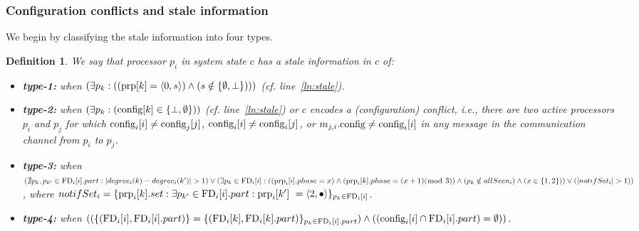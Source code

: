 \documentclass[11pt]{article}
\newcommand{\notif}{prp}
\newcommand{\notifSet}{notifSet}
\newtheorem{definition}{Definition}[section]
\begin{document}
\subsubsection*{Configuration conflicts and stale information}


We begin by classifying the stale information into four types. 


\begin{definition}
\label{def:type}
We say that processor $p_i$ in system state $c$ has a stale information in $c$ of:
\begin{itemize}[topsep=2pt,itemsep=-.5ex,partopsep=.5ex,parsep=1ex,leftmargin=.5cm]
	\item[]{\bf type-1:} when 
$(\exists p_k : ((\textnormal{prp}[k]=\langle 0, s \rangle) \land (s \notin \{ \emptyset, \bot\})))$ (cf. line~\ref{ln:stale}). 
	\item[]{\bf type-2:} when $(\exists p_k : (\textnormal{config}[k] \in \{ \bot, \emptyset\}))$ (cf. line~\ref{ln:stale}) or $c$ encodes a \emph{(configuration) conflict}, i.e., there are two active processors $p_i$ and $p_j$ for which $\textnormal{config}_i[i] \neq \textnormal{config}_j[j]$, $\textnormal{config}_i[i] \neq \textnormal{config}_i[j]$, or $m_{j,i}.\textnormal{config}\neq\textnormal{config}_i[i]$ in any message in the communication channel from $p_i$ to $p_j$.
\item[]{\bf type-3:} when $(\nexists p_k, p_{k'} \in \textnormal{FD}_i[i].part: |degree_i(k)-degree_i(k')|> 1) \lor (\exists p_k \in \textnormal{FD}_i[i] : ((\textnormal{\notif}_i[i].phase =x) \land (\textnormal{\notif}_i[k].phase =(x+1)(\bmod ~3)) \land (p_k \notin allSeen_i) \land (x \in \{1, 2 \} ))\lor (|\notifSet_i|>1))$, where $\notifSet_i=\{ \textnormal{\notif}_i[k].set : \exists p_{k'} \in \textnormal{FD}_i[i].part:\textnormal{\notif}_i[k']$ $ = \langle 2, \bullet \rangle \}_{p_k \in \textnormal{FD}_i[i]}$. 
	\item[]{\bf type-4:} when $((\{(\textnormal{FD}_i[i],\textnormal{FD}_i[i].part)\}=\{(\textnormal{FD}_i[k],\textnormal{FD}_i[k].part)\}_{p_k \in \textnormal{FD}_i[i].part}) \land ((\textnormal{config}_i[i]\cap\textnormal{FD}_i[i].part) = \emptyset))$.
\end{itemize}
\end{definition} 
\end{document}
